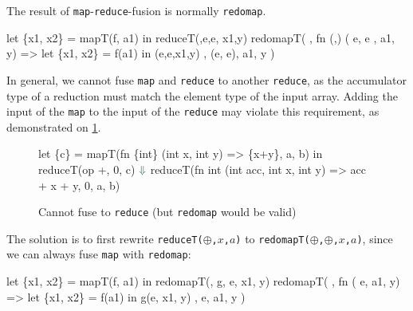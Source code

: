 The result of \texttt{map}-\texttt{reduce}-fusion is normally
\texttt{redomap}.

\begin{colorcode}
let \{x1, x2\} = mapT(f, a1)
in  reduceT(\mymath{\oplus},e,e, x1,y)
    \emphh{\mymath{\Downarrow}}
redomapT(\mymath{\oplus}
, fn (,) (  e,  e
             ,  a1, y)
   => let \{x1, x2\} = f(a1)
      in  \mymath{\oplus}(e,e,x1,y)
, (e, e), a1, y )
\end{colorcode}

In general, we cannot fuse \texttt{map} and \texttt{reduce} to another
\texttt{reduce}, as the accumulator type of a reduction must match the
element type of the input array. Adding the input of the \texttt{map}
to the input of the \texttt{reduce} may violate this requirement, as
demonstrated on \cref{fig:map-reduce-error}.

\begin{figure}
\begin{center}
\begin{colorcode}
let \{c\} = mapT(fn \{int\} (int x, int y) => \{x+y\},
                 a, b) in
reduceT(op +, 0, c)
  \(\emphh{\Downarrow}\)
reduceT(fn int (int acc, int x, int y) => acc + x + y,
        0, a, b) 
\end{colorcode}
\end{center}

\caption{Cannot fuse to \texttt{reduce} (but \texttt{redomap} would be valid)}
\label{fig:map-reduce-error}
\end{figure}

The solution is to first rewrite \texttt{reduceT($\oplus$,$x$,$a$)} to
\texttt{redomapT($\oplus$,$\oplus$,$x$,$a$)}, since we can always fuse
\texttt{map} with \texttt{redomap}:

\begin{colorcode}
let \{x1, x2\} = mapT(f, a1)
in  redomapT(\mymath{\oplus}, g, e, x1, y)
    \emphh{\mymath{\Downarrow}}
redomapT(\mymath{\oplus}
, fn \mymath{\beta} (\mymath{\beta} e,  a1,  y)
   => let \{x1, x2\} = f(a1)
      in  g(e, x1, y)
, e, a1, y )
\end{colorcode}

